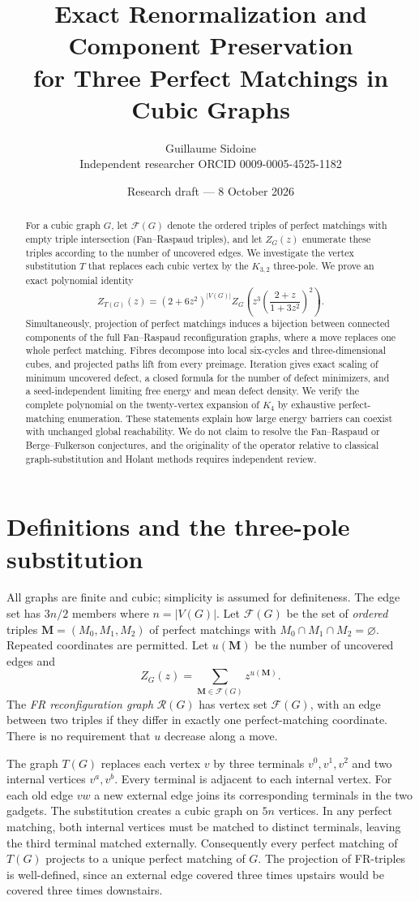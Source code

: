 \documentclass[11pt]{article}
\title{Exact Renormalization and Component Preservation\\for Three Perfect Matchings in Cubic Graphs}
\author{Guillaume Sidoine\\\small Independent researcher \quad ORCID 0009-0005-4525-1182}
\date{Research draft --- 8 October 2026}
\newcommand{\FR}{\mathcal{F}}
\newcommand{\Rconf}{\mathcal{R}}
\begin{document}
\maketitle
\begin{abstract}
For a cubic graph $G$, let $\FR(G)$ denote the ordered triples of perfect matchings with empty triple intersection (Fan--Raspaud triples), and let $Z_G(z)$ enumerate these triples according to the number of uncovered edges. We investigate the vertex substitution $T$ that replaces each cubic vertex by the $K_{3,2}$ three-pole. We prove an exact polynomial identity
\[
 Z_{T(G)}(z)=(2+6z^2)^{|V(G)|}Z_G\!\left(z^3\left(\frac{2+z}{1+3z^2}\right)^2\right).
\]
Simultaneously, projection of perfect matchings induces a bijection between connected components of the full Fan--Raspaud reconfiguration graphs, where a move replaces one whole perfect matching. Fibres decompose into local six-cycles and three-dimensional cubes, and projected paths lift from every preimage. Iteration gives exact scaling of minimum uncovered defect, a closed formula for the number of defect minimizers, and a seed-independent limiting free energy and mean defect density. We verify the complete polynomial on the twenty-vertex expansion of $K_4$ by exhaustive perfect-matching enumeration. These statements explain how large energy barriers can coexist with unchanged global reachability. We do not claim to resolve the Fan--Raspaud or Berge--Fulkerson conjectures, and the originality of the operator relative to classical graph-substitution and Holant methods requires independent review.
\end{abstract}

\section{Definitions and the three-pole substitution}
All graphs are finite and cubic; simplicity is assumed for definiteness. The edge set has $3n/2$ members where $n=|V(G)|$. Let $\FR(G)$ be the set of \emph{ordered} triples $\mathbf M=(M_0,M_1,M_2)$ of perfect matchings with $M_0\cap M_1\cap M_2=\varnothing$. Repeated coordinates are permitted. Let $u(\mathbf M)$ be the number of uncovered edges and
\[
 Z_G(z)=\sum_{\mathbf M\in\FR(G)}z^{u(\mathbf M)}.
\]
The \emph{FR reconfiguration graph} $\Rconf(G)$ has vertex set $\FR(G)$, with an edge between two triples if they differ in exactly one perfect-matching coordinate. There is no requirement that $u$ decrease along a move.

The graph $T(G)$ replaces each vertex $v$ by three terminals $v^0,v^1,v^2$ and two internal vertices $v^a,v^b$. Every terminal is adjacent to each internal vertex. For each old edge $vw$ a new external edge joins its corresponding terminals in the two gadgets. The substitution creates a cubic graph on $5n$ vertices. In any perfect matching, both internal vertices must be matched to distinct terminals, leaving the third terminal matched externally. Consequently every perfect matching of $T(G)$ projects to a unique perfect matching of $G$. The projection of FR-triples is well-defined, since an external edge covered three times upstairs would be covered three times downstairs.
\end{document}
